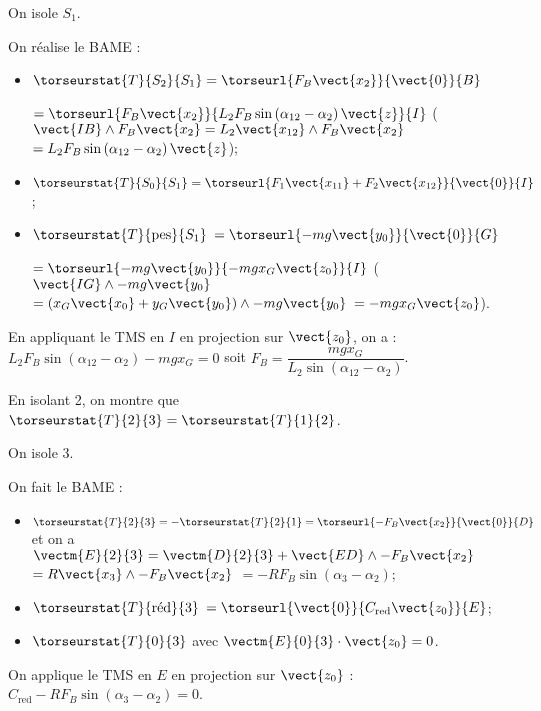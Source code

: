 \ifnormal
{}
\else
\fi

\ifprof
\begin{corrige}
On isole $S_1$. 

On réalise le BAME : 
\begin{itemize}
\item $\torseurstat{T}{S_2}{S_1}=\torseurl{ F_B\vect{x_{2}}}{\vect{0}}{B}$ 

$=\torseurl{ F_B\vect{x_{2}}}{L_2 F_B \sin  \left(\alpha_{12}-\alpha_2\right) \vect{z}}{I}$ ($\vect{IB}\wedge F_B\vect{x_{2}}=L_2\vect{x_{12}}\wedge  F_B\vect{x_{2}}$ $=L_2 F_B \sin  \left(\alpha_{12}-\alpha_2\right) \vect{z}$);
\item $\torseurstat{T}{S_0}{S_1}=\torseurl{F_1\vect{x_{11}}+F_2\vect{x_{12}}}{\vect{0}}{I}$;
\item $\torseurstat{T}{ \text{pes} }{S_1}$ $=\torseurl{-mg \vect{y_{0}}}{\vect{0}}{G}$

$=\torseurl{-mg \vect{y_{0}}}{-mgx_G\vect{z_{0}}}{I}$ ($\vect{IG}\wedge -mg \vect{y_{0}}$ $=\left(x_G\vect{x_{0}}+y_G\vect{y_{0}} \right) \wedge  -mg \vect{y_{0}}$ $= -mgx_G\vect{z_{0}}$).
\end{itemize}

En appliquant le TMS en $I$ en projection sur $\vect{z_0}$, on a : 
$L_2 F_B \sin  \left(\alpha_{12}-\alpha_2\right)  -mgx_G = 0 $ soit
$ F_B    = \dfrac{mgx_G}{L_2  \sin  \left(\alpha_{12}-\alpha_2\right)} $. 
\end{corrige}
\else
\fi

\ifprof
\begin{corrige}
En isolant 2, on montre que $\torseurstat{T}{2}{3}=\torseurstat{T}{1}{2}$. 

On isole 3. 

On fait le BAME :
\begin{itemize}
\item $\torseurstat{T}{2}{3}=-\torseurstat{T}{2}{1}=\torseurl{ -F_B\vect{x_{2}}}{\vect{0}}{D}$ et on a $\vectm{E}{2}{3} = \vectm{D}{2}{3} + \vect{ED}\wedge -F_B\vect{x_{2}}$ $=R\vect{x_3}\wedge -F_B\vect{x_{2}}$ $=-RF_B \sin\left( \alpha_3- \alpha_2\right)$;
\item $\torseurstat{T}{\text{réd}}{3}$ $ = \torseurl{ \vect{0}}{C_{\text{red}}\vect{z_0}}{E}$;
\item $\torseurstat{T}{0}{3}$ avec $\vectm{E}{0}{3}\cdot \vect{z_0} = 0$.
\end{itemize}
On applique le TMS en $E$ en projection sur $\vect{z_0}$ : $C_{\text{red}}-RF_B \sin \left( \alpha_3 - \alpha_2\right) = 0$.
\end{corrige}
\else
\fi

